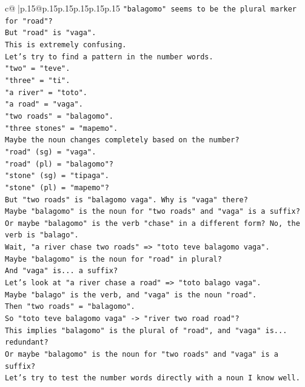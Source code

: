 \documentclass{article}
\begin{document}
{\begin{supertabular}{c@{$\;$}|p{.15\linewidth}@{}p{.15\linewidth}p{.15\linewidth}p{.15\linewidth}p{.15\linewidth}p{.15\linewidth}}
{{{\texttt{"balagomo" seems to be the plural marker for "road"?} \\
\texttt{But "road" is "vaga".} \\
\texttt{This is extremely confusing.} \\
\texttt{Let's try to find a pattern in the number words.} \\
\texttt{"two" = "teve".} \\
\texttt{"three" = "ti".} \\
\texttt{"a river" = "toto".} \\
\texttt{"a road" = "vaga".} \\
\texttt{"two roads" = "balagomo".} \\
\texttt{"three stones" = "mapemo".} \\
\texttt{Maybe the noun changes completely based on the number?} \\
\texttt{"road" (sg) = "vaga".} \\
\texttt{"road" (pl) = "balagomo"?} \\
\texttt{"stone" (sg) = "tipaga".} \\
\texttt{"stone" (pl) = "mapemo"?} \\
\texttt{But "two roads" is "balagomo vaga". Why is "vaga" there?} \\
\texttt{Maybe "balagomo" is the noun for "two roads" and "vaga" is a suffix?} \\
\texttt{Or maybe "balagomo" is the verb "chase" in a different form? No, the verb is "balago".} \\
\texttt{Wait, "a river chase two roads" => "toto teve balagomo vaga".} \\
\texttt{Maybe "balagomo" is the noun for "road" in plural?} \\
\texttt{And "vaga" is... a suffix?} \\
\texttt{Let's look at "a river chase a road" => "toto balago vaga".} \\
\texttt{Maybe "balago" is the verb, and "vaga" is the noun "road".} \\
\texttt{Then "two roads" = "balagomo".} \\
\texttt{So "toto teve balagomo vaga" {-}> "river two road road"?} \\
\texttt{This implies "balagomo" is the plural of "road", and "vaga" is... redundant?} \\
\texttt{Or maybe "balagomo" is the noun for "two roads" and "vaga" is a suffix?} \\
\texttt{Let's try to test the number words directly with a noun I know well.} \\
}}}
\end{supertabular}}
\end{document}
